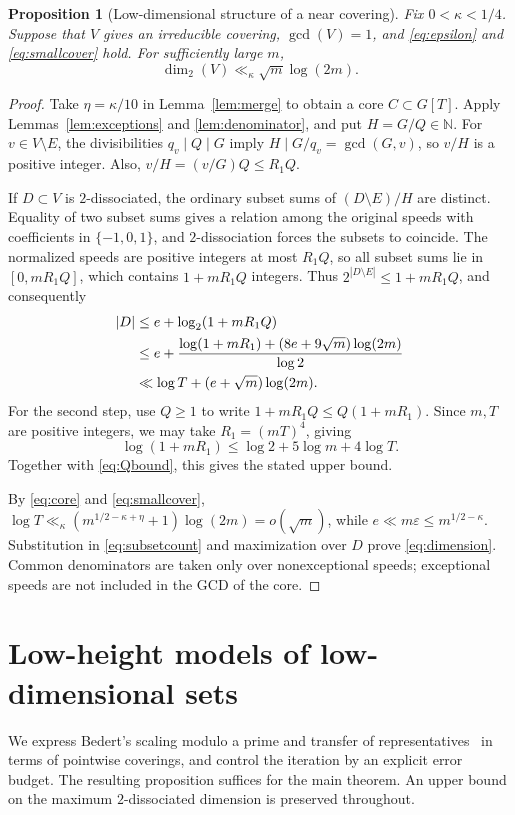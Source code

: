 \documentclass[12pt,leqno]{article}
\numberwithin{equation}{section}
\newtheorem{proposition}[theorem]{Proposition}
\theoremstyle{remark}
\newcommand{\LRnatural}{\mathbb N}
\newcommand{\LRdimension}{\operatorname{dim}_2}
\begin{document}
\begin{proposition}[Low-dimensional structure of a near covering]\label{prop:dimension}
Fix $0<\kappa<1/4$. Suppose that $V$ gives an irreducible covering, $\gcd(V)=1$, and \eqref{eq:epsilon} and \eqref{eq:smallcover} hold. For sufficiently large $m$,
\begin{equation}\label{eq:dimension}
\LRdimension(V)\ll_\kappa\sqrt m\log(2m).
\end{equation}
\end{proposition}
\begin{proof}
Take $\eta=\kappa/10$ in Lemma~\ref{lem:merge} to obtain a core $C\subset G[T]$. Apply Lemmas~\ref{lem:exceptions} and \ref{lem:denominator}, and put $H=G/Q\in\LRnatural$. For $v\in V\setminus E$, the divisibilities $q_v\mid Q\mid G$ imply $H\mid G/q_v=\gcd(G,v)$, so $v/H$ is a positive integer. Also, $v/H=(v/G)Q\le R_1Q$.

If $D\subset V$ is $2$-dissociated, the ordinary subset sums of $(D\setminus E)/H$ are distinct. Equality of two subset sums gives a relation among the original speeds with coefficients in $\{-1,0,1\}$, and $2$-dissociation forces the subsets to coincide. The normalized speeds are positive integers at most $R_1Q$, so all subset sums lie in $[0,mR_1Q]$, which contains $1+mR_1Q$ integers. Thus $2^{|D\setminus E|}\le1+mR_1Q$, and consequently
\begin{align}\label{eq:subsetcount}
|D|&\le e+\log_2(1+mR_1Q)\notag\\
&\le e+\frac{\log(1+mR_1)+(8e+9\sqrt m)\log(2m)}{\log2}\notag\\
&\ll\log T+(e+\sqrt m)\log(2m).
\end{align}
For the second step, use $Q\ge1$ to write $1+mR_1Q\le Q(1+mR_1)$. Since $m,T$ are positive integers, we may take $R_1=(mT)^4$, giving
\[
\log(1+mR_1)\le\log2+5\log m+4\log T.
\]
Together with \eqref{eq:Qbound}, this gives the stated upper bound.

By \eqref{eq:core} and \eqref{eq:smallcover},
$\log T\ll_\kappa(m^{1/2-\kappa+\eta}+1)\log(2m)=o(\sqrt m)$, while $e\ll m\varepsilon\le m^{1/2-\kappa}$. Substitution in \eqref{eq:subsetcount} and maximization over $D$ prove \eqref{eq:dimension}. Common denominators are taken only over nonexceptional speeds; exceptional speeds are not included in the GCD of the core.
\end{proof}


\section{Low-height models of low-dimensional sets}
We express Bedert's scaling modulo a prime and transfer of representatives~\cite[Section 5, Lemmas 5.1--5.2]{Bedert} in terms of pointwise coverings, and control the iteration by an explicit error budget. The resulting proposition suffices for the main theorem. An upper bound on the maximum $2$-dissociated dimension is preserved throughout.
\end{document}
